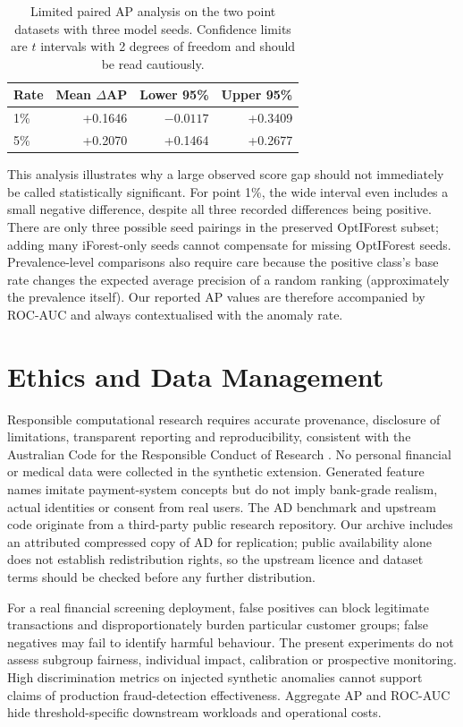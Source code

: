 \documentclass[11pt]{article}
\begin{document}
\begin{table}[t]
\centering\small
\caption{Limited paired AP analysis on the two point datasets with three model seeds. Confidence limits are $t$ intervals with 2 degrees of freedom and should be read cautiously.}
\label{tab:paired}
\begin{tabular}{@{}lrrr@{}}
\toprule
Rate & Mean $\Delta$AP & Lower 95\% & Upper 95\% \\
\midrule
1\% & +0.1646 & $-0.0117$ & +0.3409 \\
5\% & +0.2070 & +0.1464 & +0.2677 \\
\bottomrule
\end{tabular}
\end{table}
 
This analysis illustrates why a large observed score gap should not immediately be called statistically significant. For point 1\%, the wide interval even includes a small negative difference, despite all three recorded differences being positive. There are only three possible seed pairings in the preserved OptIForest subset; adding many iForest-only seeds cannot compensate for missing OptIForest seeds. Prevalence-level comparisons also require care because the positive class's base rate changes the expected average precision of a random ranking (approximately the prevalence itself). Our reported AP values are therefore accompanied by ROC-AUC and always contextualised with the anomaly rate.
 
\section{Ethics and Data Management}
Responsible computational research requires accurate provenance, disclosure of limitations, transparent reporting and reproducibility, consistent with the Australian Code for the Responsible Conduct of Research \citep{nhmrc2018}. No personal financial or medical data were collected in the synthetic extension. Generated feature names imitate payment-system concepts but do not imply bank-grade realism, actual identities or consent from real users. The AD benchmark and upstream code originate from a third-party public research repository. Our archive includes an attributed compressed copy of AD for replication; public availability alone does not establish redistribution rights, so the upstream licence and dataset terms should be checked before any further distribution.
 
For a real financial screening deployment, false positives can block legitimate transactions and disproportionately burden particular customer groups; false negatives may fail to identify harmful behaviour. The present experiments do not assess subgroup fairness, individual impact, calibration or prospective monitoring. High discrimination metrics on injected synthetic anomalies cannot support claims of production fraud-detection effectiveness. Aggregate AP and ROC-AUC hide threshold-specific downstream workloads and operational costs.
 
\end{document}
